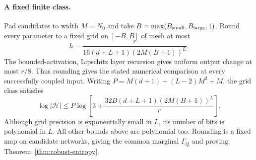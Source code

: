 \paragraph{A fixed finite class.}
Pad candidates to width $M=N_0$ and take
$B=\max(B_{\rm small},B_{\rm large},1)$. Round every parameter to a fixed
grid on $[-B,B]$ of mesh at most
\[
 h=\frac{r}{16(d+L+1)(2M(B+1))^L}.
\]
The bounded-activation, Lipschitz layer recursion gives uniform output change
at most $r/8$. Thus rounding gives the stated numerical comparison at every
successfully coupled input.
Writing $P=M(d+1)+(L-2)M^2+M$, the grid class satisfies
\[
 \log|\mathcal H|\le
 P\log\left[3+\frac{32B(d+L+1)(2M(B+1))^L}{r}\right].
\]
Although grid precision is exponentially small in $L$, its number of bits is
polynomial in $L$. All other bounds above are polynomial too. Rounding is a
fixed map on candidate networks, giving the common marginal $\Gamma_Q$ and
proving Theorem~\ref{thm:robust-entropy}.


